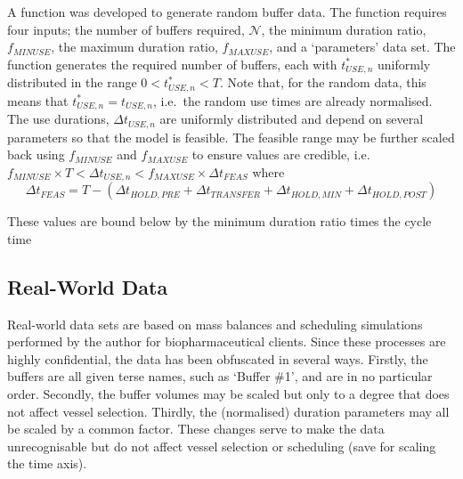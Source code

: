 A function was developed to generate random buffer data.
The function requires four inputs; the number of buffers required,
$\mathcal{N}$, the minimum duration ratio, $f_{\mathit{MINUSE}}$, the maximum
duration ratio, $f_{\mathit{MAXUSE}}$, and a `parameters' data set.
The function generates the required number of buffers, each with
$t_{\mathit{USE},n}^{*}$ uniformly distributed in the range
$0 < t_{\mathit{USE},n}^{*} < T$. Note that, for the random data, this means
that $t_{\mathit{USE},n}^{*} = t_{\mathit{USE},n}$, i.e.\ the random use
times are already normalised.
The use durations, $\Delta t_{\mathit{USE},n}$ are uniformly distributed and
depend on several parameters so that the model is feasible.  The feasible range
may be further scaled back using $f_{\mathit{MINUSE}}$ and
$f_{\mathit{MAXUSE}}$ to ensure values are credible, i.e.\
$f_{\mathit{MINUSE}} \times T < \Delta t_{\mathit{USE},n} < f_{\mathit{MAXUSE}}
 \times \Delta t_{\mathit{FEAS}}$
where
\begin{equation}
    \Delta t_{\mathit{FEAS}} = T - \left( 
    \Delta t_{\mathit{HOLD,PRE}}
    + \Delta t_{\mathit{TRANSFER}}
    + \Delta t_{\mathit{HOLD,MIN}}
    + \Delta t_{\mathit{HOLD,POST}} \right)
\end{equation}

These values are bound below by the minimum duration ratio times the cycle time

\subsection{Real-World Data}\label{SS.realdata}
Real-world data sets are based on mass balances and scheduling simulations
performed by the author for biopharmaceutical clients.
Since these processes are highly confidential, the data has been obfuscated in
several ways.
Firstly, the buffers are all given terse names, such as `Buffer \#1', and are
in no particular order.
Secondly, the buffer volumes may be scaled but only to a degree that does not
affect vessel selection.
Thirdly, the (normalised) duration parameters may all be scaled by a common
factor.
These changes serve to make the data unrecognisable but do not affect vessel
selection or scheduling (save for scaling the time axis).





